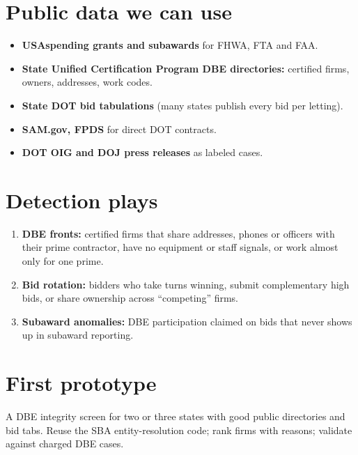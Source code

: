 \documentclass[letterpaper,11pt]{article}
\providecommand{\tightlist}{\setlength{\itemsep}{0pt}\setlength{\parskip}{0pt}}
\begin{document}
\hypertarget{public-data-we-can-use}{%
\section{Public data we can use}\label{public-data-we-can-use}}

\begin{itemize}
\tightlist
\item
  \textbf{USAspending grants and subawards} for FHWA, FTA and FAA.
\item
  \textbf{State Unified Certification Program DBE directories:}
  certified firms, owners, addresses, work codes.
\item
  \textbf{State DOT bid tabulations} (many states publish every bid per
  letting).
\item
  \textbf{SAM.gov, FPDS} for direct DOT contracts.
\item
  \textbf{DOT OIG and DOJ press releases} as labeled cases.
\end{itemize}

\hypertarget{detection-plays}{%
\section{Detection plays}\label{detection-plays}}

\begin{enumerate}
\def\labelenumi{\arabic{enumi}.}
\tightlist
\item
  \textbf{DBE fronts:} certified firms that share addresses, phones or
  officers with their prime contractor, have no equipment or staff
  signals, or work almost only for one prime.
\item
  \textbf{Bid rotation:} bidders who take turns winning, submit
  complementary high bids, or share ownership across ``competing''
  firms.
\item
  \textbf{Subaward anomalies:} DBE participation claimed on bids that
  never shows up in subaward reporting.
\end{enumerate}

\hypertarget{first-prototype}{%
\section{First prototype}\label{first-prototype}}

A DBE integrity screen for two or three states with good public
directories and bid tabs. Reuse the SBA entity-resolution code; rank
firms with reasons; validate against charged DBE cases.
\end{document}
